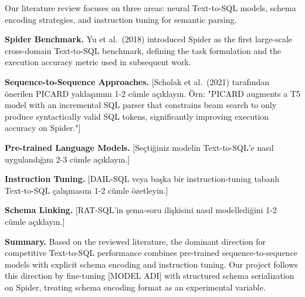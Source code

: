 \documentclass[11pt,a4paper]{article}
\begin{document}

Our literature review focuses on three areas: neural Text-to-SQL models,
schema encoding strategies, and instruction tuning for semantic parsing.

\noindent\textbf{Spider Benchmark.}
Yu et al.~(2018) introduced Spider as the first large-scale cross-domain
Text-to-SQL benchmark, defining the task formulation and the execution
accuracy metric used in subsequent work.

\noindent\textbf{Sequence-to-Sequence Approaches.}
[Scholak et al.~(2021) tarafından önerilen PICARD yaklaşımını 1-2 cümle açıklayın.
Örn: "PICARD augments a T5 model with an incremental SQL parser that constrains
beam search to only produce syntactically valid SQL tokens, significantly
improving execution accuracy on Spider."]

\noindent\textbf{Pre-trained Language Models.}
[Seçtiğiniz modelin Text-to-SQL'e nasıl uygulandığını 2-3 cümle açıklayın.]

\noindent\textbf{Instruction Tuning.}
[DAIL-SQL veya başka bir instruction-tuning tabanlı Text-to-SQL çalışmasını
1-2 cümle özetleyin.]

\noindent\textbf{Schema Linking.}
[RAT-SQL'in şema-soru ilişkisini nasıl modellediğini 1-2 cümle açıklayın.]

\noindent\textbf{Summary.}
Based on the reviewed literature, the dominant direction for competitive
Text-to-SQL performance combines pre-trained sequence-to-sequence models with
explicit schema encoding and instruction tuning.
Our project follows this direction by fine-tuning [MODEL ADI] with structured
schema serialization on Spider, treating schema encoding format as an
experimental variable.

\end{document}
